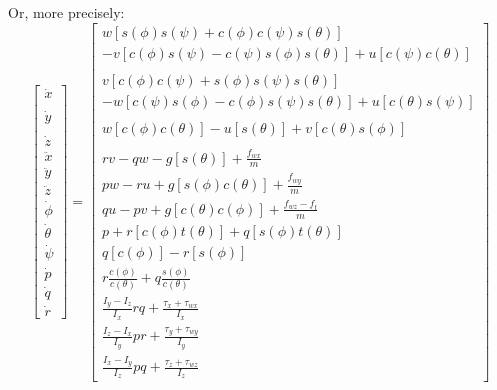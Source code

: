 Or, more precisely:
$$
\left[
\begin{array}{c}
\dot{x} \\
{}\\
\dot{y} \\
{}\\
\dot{z} \\
\ddot{x} \\
\ddot{y} \\
\ddot{z} \\
\dot{\phi} \\
\dot{\theta} \\
\dot{\psi} \\
\dot{p} \\
\dot{q} \\
\dot{r}
\end{array}
\right]
=
\left[
\begin{array}{l}
  w[s(\phi) s(\psi)+c(\phi) c(\psi) s(\theta)] \\-v[c(\phi) s(\psi)-c(\psi) s(\phi) s(\theta)] +u[c(\psi) c(\theta)] \\
\\
  v[c(\phi) c(\psi)+s(\phi) s(\psi) s(\theta)]\\-w[c(\psi) s(\phi)-c(\phi) s(\psi) s(\theta)]
  +u[c(\theta) s(\psi)] \\

  \\
  w[c(\phi) c(\theta)]-u[s(\theta)] +v[c(\theta) s(\phi)] \\

  \\
  r v-q w-g[s(\theta)]+\frac{f_{w x}}{m}\\
  p w-r u+g[s(\phi) c(\theta)]+\frac{f_{w y}}{m}\\
  q u-p v+g[c(\theta) c(\phi)]+\frac{f_{w z}-f_{t}}{m}\\

  p+r[c(\phi) t(\theta)]+q[s(\phi) t(\theta)] \\
  q[c(\phi)]-r[s(\phi)] \\
  r \frac{c(\phi)}{c(\theta)}+q \frac{s(\phi)}{c(\theta)} \\

\frac{I_{y}-I_{z}}{I_{x}} r q+\frac{\tau_{x}+\tau_{w x}}{I_{x}} \\
\frac{I_{z}-I_{x}}{I_{y}} p r+\frac{\tau_{y}+\tau_{w y}}{I_{y}} \\
\frac{I_{x}-I_{y}}{I_{z}} p q+\frac{\tau_{z}+\tau_{w z}}{I_{z}}

\end{array}
\right]
$$


